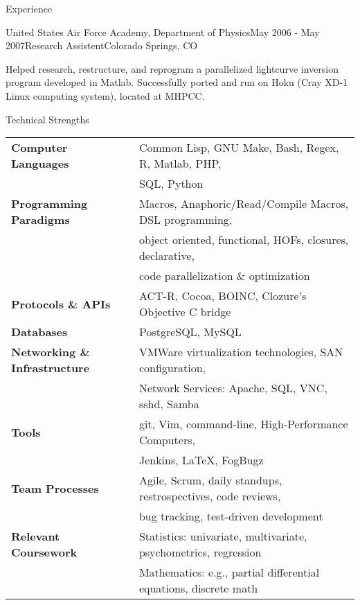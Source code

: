 \documentclass{resume} %
\begin{document}
\begin{rSection}{Experience}
\begin{rSubsection}{United States Air Force Academy, Department of Physics}{May 2006 - May 2007}{Research Assistent}{Colorado Springs, CO}
\item Helped research, restructure, and reprogram a parallelized lightcurve inversion program developed in Matlab.
Successfully ported and run on Hoku (Cray XD-1 Linux computing system), located at MHPCC.
\end{rSubsection}


\end{rSection}


\begin{rSection}{Technical Strengths}

\begin{tabular}{ @{} >{\bfseries}l @{\hspace{6ex}} l }
Computer Languages & 		Common Lisp, GNU Make, Bash, Regex, R, Matlab, PHP, \\
& 				SQL, Python \\
Programming Paradigms &		Macros, Anaphoric/Read/Compile Macros, DSL programming, \\
& 				object oriented, functional, HOFs, closures, declarative, \\
&				code parallelization \& optimization \\
Protocols \& APIs & 		ACT-R, Cocoa, BOINC, Clozure's Objective C bridge \\
Databases &			PostgreSQL, MySQL \\
Networking \& Infrastructure &	VMWare virtualization technologies, SAN configuration, \\
&				Network Services: Apache, SQL, VNC, sshd, Samba \\
Tools & 			git, Vim, command-line, High-Performance Computers, \\
&				Jenkins, \LaTeX, FogBugz \\
Team Processes & 		Agile, Scrum, daily standups, restrospectives, code reviews, \\
& 				bug tracking, test-driven development \\
Relevant Coursework &		Statistics: univariate, multivariate, psychometrics, regression \\
&				Mathematics: e.g., partial differential equations, discrete math
\end{tabular}

\end{rSection}
\end{document}

